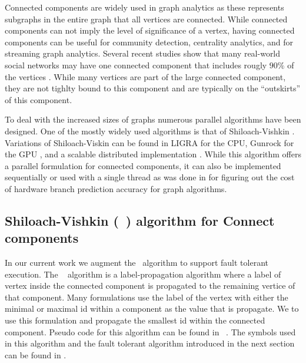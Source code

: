 


Connected components are widely used in graph analytics as these represents subgraphs in the entire 
graph that all vertices are connected. While connected components can not imply the level of 
significance of a vertex, having connected components can be useful for community detection, 
centrality analytics, and for streaming graph analytics.  
Several recent studies show that many real-world social networks may have one connected component 
that includes rougly $90\%$ of the vertices \cite{leskovec2009community,strogatz2001exploring}. 
While many vertices are part of the large connected component, they are not tighlty bound to this 
component and are typically on the ``outskirts'' of this component.

To deal with the increased sizes of graphs numerous parallel algorithms have been designed. One of 
the mostly widely used algorithms is that of Shiloach-Vishkin \cite{ShiloachVishkin}. Variations 
of Shiloach-Viskin can be found in LIGRA \cite{ligra} for the CPU, Gunrock for the GPU 
\cite{gunrock}, and a scalable distributed implementation \cite{flick2015parallel}.	
While this algorithm offers a parallel formulation for connected components, it can also be 
implemented sequentially or used with a single thread as was done in \cite{greenbranchavoiding} for 
figuring out the cost of hardware branch prediction accuracy for graph algorithms. 

\subsection*{Shiloach-Vishkin (~\sv) algorithm for Connect components}

In our current work we augment the ~\sv algorithm to support fault tolerant execution. The ~\sv 
algorithm is a label-propagation algorithm where a label of vertex inside the 
connected component is propagated to the remaining vertice of that component. Many formulations 
use the label of the vertex with either the minimal or maximal id within a component as the value 
that is propagate. We to use this formulation and propagate the smallest id within the connected 
component. Pseudo code for this algorithm can be found in ~. The symbols 
used in this algorithm and the fault tolerant algorithm introduced in the next section can be found 
in .


